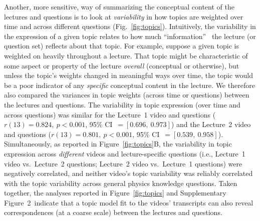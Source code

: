 \documentclass[10pt]{article}
\newcommand{\topicWeights}{2}
\begin{document}
Another, more sensitive, way of summarizing the conceptual content of the
lectures and questions is to look at \textit{variability} in how topics are
weighted over time and across different questions (Fig.~\ref{fig:topics}).
Intuitively, the variability in the expression of a given topic relates to how
much ``information''~\citep{Fish22} the lecture (or question set) reflects
about that topic. For example, suppose a given topic is weighted on heavily
throughout a lecture. That topic might be characteristic of some aspect or
property of the lecture \textit{overall} (conceptual or otherwise), but unless
the topic's weights changed in meaningful ways over time, the topic would be a
poor indicator of any \textit{specific} conceptual content in the lecture. We
therefore also compared the variances in topic weights (across time or
questions) between the lectures and questions. The variability in topic
expression (over time and across questions) was similar for the Lecture~1 video
and questions ($r(13) = 0.824,~p<0.001$, 95\% CI~$= [0.696,~0.973]$) and the
Lecture~2 video and questions ($r(13) = 0.801,~p<0.001$, 95\% CI~$=
[0.539,~0.958]$). Simultaneously, as reported in Figure~\ref{fig:topics}B, the
variability in topic expression across \textit{different} videos and
lecture-specific questions (i.e., Lecture~1 video vs.~Lecture~2 questions;
Lecture~2 video vs.~Lecture~1 questions) were negatively correlated, and
neither video's topic variability was reliably correlated with the topic
variability across general physics knowledge questions. Taken together, the
analyses reported in Figure~\ref{fig:topics} and Supplementary
Figure~\topicWeights~indicate that a topic model fit to the videos' transcripts
can also reveal correspondences (at a coarse scale) between the lectures and
questions.
\end{document}
